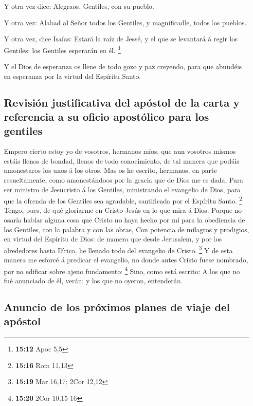  Y otra vez dice: Alegraos, Gentiles, con su pueblo.

 Y otra vez: Alabad al Señor todos los Gentiles, y
magnificadle, todos los pueblos.

 Y otra vez, dice Isaías: Estará la raíz de Jessé, y el que
se levantará á regir los Gentiles: los Gentiles esperarán en él.
\footnote{\textbf{15:12} Apoc 5,5}

 Y el Dios de esperanza os llene de todo gozo y paz
creyendo, para que abundéis en esperanza por la virtud del Espíritu
Santo.

\hypertarget{revisiuxf3n-justificativa-del-apuxf3stol-de-la-carta-y-referencia-a-su-oficio-apostuxf3lico-para-los-gentiles}{%
\subsection{Revisión justificativa del apóstol de la carta y referencia
a su oficio apostólico para los
gentiles}\label{revisiuxf3n-justificativa-del-apuxf3stol-de-la-carta-y-referencia-a-su-oficio-apostuxf3lico-para-los-gentiles}}

 Empero cierto estoy yo de vosotros, hermanos míos, que aun
vosotros mismos estáis llenos de bondad, llenos de todo conocimiento, de
tal manera que podáis amonestaros los unos á los otros. 
Mas os he escrito, hermanos, en parte resueltamente, como amonestándoos
por la gracia que de Dios me es dada,  Para ser ministro de
Jesucristo á los Gentiles, ministrando el evangelio de Dios, para que la
ofrenda de los Gentiles sea agradable, santificada por el Espíritu
Santo. \footnote{\textbf{15:16} Rom 11,13}  Tengo, pues, de
qué gloriarme en Cristo Jesús en lo que mira á Dios. 
Porque no osaría hablar alguna cosa que Cristo no haya hecho por mí para
la obediencia de los Gentiles, con la palabra y con las obras,
 Con potencia de milagros y prodigios, en virtud del
Espíritu de Dios: de manera que desde Jerusalem, y por los alrededores
hasta Ilírico, he llenado todo del evangelio de Cristo. \footnote{\textbf{15:19}
  Mar 16,17; 2Cor 12,12}  Y de esta manera me esforcé á
predicar el evangelio, no donde antes Cristo fuese nombrado, por no
edificar sobre ajeno fundamento: \footnote{\textbf{15:20} 2Cor 10,15-16}
 Sino, como está escrito: A los que no fué anunciado de él,
verán: y los que no oyeron, entenderán.

\hypertarget{anuncio-de-los-pruxf3ximos-planes-de-viaje-del-apuxf3stol}{%
\subsection{Anuncio de los próximos planes de viaje del
apóstol}\label{anuncio-de-los-pruxf3ximos-planes-de-viaje-del-apuxf3stol}}

